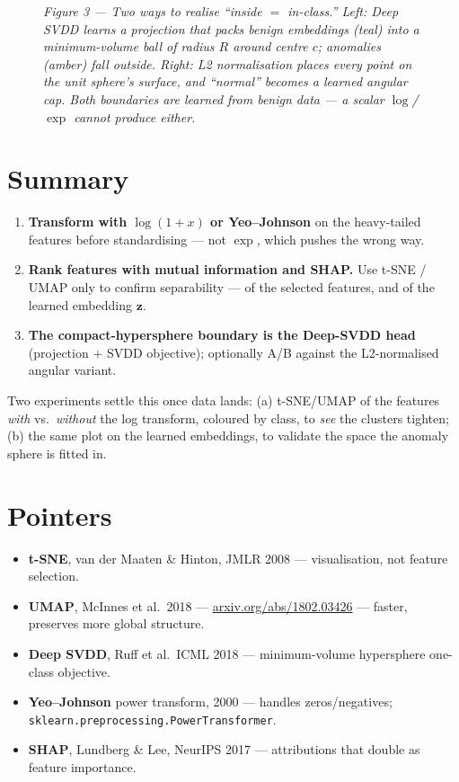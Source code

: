 \documentclass[11pt,a4paper]{article}
\begin{document}
\begin{figure}[H]
\begin{tikzpicture}
\end{tikzpicture}
\caption*{\small\textit{Figure 3 --- Two ways to realise ``inside $=$ in-class.'' Left: Deep SVDD learns a projection that packs benign embeddings (teal) into a minimum-volume ball of radius $R$ around centre $c$; anomalies (amber) fall outside. Right: L2 normalisation places every point on the unit sphere's surface, and ``normal'' becomes a learned angular cap. Both boundaries are \emph{learned} from benign data --- a scalar $\log$/$\exp$ cannot produce either.}}
\end{figure}

\section{Summary}

\begin{enumerate}[leftmargin=*, itemsep=3pt]
  \item \textbf{Transform with $\log(1+x)$ or Yeo--Johnson} on the heavy-tailed features before standardising --- not $\exp$, which pushes the wrong way.
  \item \textbf{Rank features with mutual information and SHAP.} Use t-SNE / UMAP only to confirm separability --- of the selected features, and of the learned embedding $\mathbf{z}$.
  \item \textbf{The compact-hypersphere boundary is the Deep-SVDD head} (projection $+$ SVDD objective); optionally A/B against the L2-normalised angular variant.
\end{enumerate}

Two experiments settle this once data lands: (a) t-SNE/UMAP of the features \emph{with} vs.\ \emph{without} the log transform, coloured by class, to \emph{see} the clusters tighten; (b) the same plot on the learned embeddings, to validate the space the anomaly sphere is fitted in.

\section*{Pointers}
\footnotesize
\begin{itemize}[leftmargin=*, itemsep=1pt]
  \item \textbf{t-SNE}, van der Maaten \& Hinton, JMLR 2008 --- visualisation, not feature selection.
  \item \textbf{UMAP}, McInnes et al.\ 2018 --- \href{https://arxiv.org/abs/1802.03426}{arxiv.org/abs/1802.03426} --- faster, preserves more global structure.
  \item \textbf{Deep SVDD}, Ruff et al.\ ICML 2018 --- minimum-volume hypersphere one-class objective.
  \item \textbf{Yeo--Johnson} power transform, 2000 --- handles zeros/negatives; \texttt{sklearn.preprocessing.PowerTransformer}.
  \item \textbf{SHAP}, Lundberg \& Lee, NeurIPS 2017 --- attributions that double as feature importance.
\end{itemize}
\end{document}

